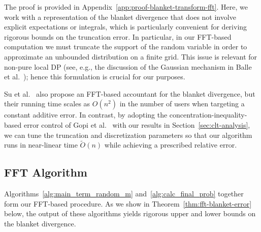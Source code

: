 \documentclass{article}
\theoremstyle{plain}
\theoremstyle{definition}
\begin{document}
The proof is provided in Appendix~\ref{app:proof-blanket-transform-fft}.
Here, we work with a representation of the blanket divergence that does not involve explicit expectations or integrals, which is particularly convenient for
deriving rigorous bounds on the truncation error.
In particular, in our FFT-based computation we must truncate the support of
the random variable in order to approximate an unbounded distribution on a finite grid.
This issue is relevant for non-pure local DP (see, e.g., the discussion of the Gaussian mechanism in Balle et al.~\cite{ballePrivacyBlanketShuffle2019}); hence this formulation is crucial for our purposes.


Su et al.~\cite{suDecompositionBasedOptimalBounds2025} also propose an FFT-based
accountant for the blanket divergence, but their running time scales
as $O(n^2)$ in the number of users when targeting a constant additive error.
In contrast, by adopting the concentration-inequality-based error control of
Gopi et al.~\cite{gopiNumericalCompositionDifferential2021} with our results in Section~\ref{sec:clt-analysis}, we can tune the
truncation and discretization parameters so that our algorithm runs in
near-linear time $\widetilde O(n)$ while achieving a prescribed relative error.



\subsection{FFT Algorithm}
\label{sec:fft}

Algorithms~\ref{alg:main_term_random_m}
and~\ref{alg:calc_final_prob} together form our FFT-based procedure.
As we show in Theorem~\ref{thm:fft-blanket-error} below, the output of
these algorithms yields rigorous upper and lower bounds on the blanket
divergence.

\renewcommand{\algorithmicrequire}{\textbf{Input:}}
\renewcommand{\algorithmicensure}{\textbf{Output:}}
\end{document}
